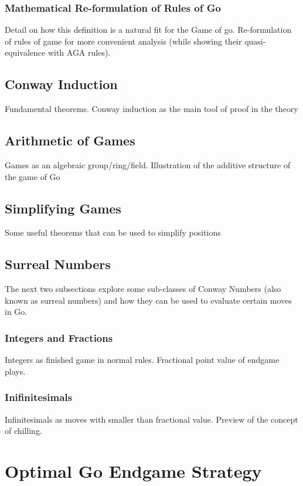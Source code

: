 \documentclass{article}[12pt]
\begin{document}
\subsubsection{Mathematical Re-formulation of Rules of Go}
Detail on how this definition is a natural fit for the Game of go. 
Re-formulation of rules of game for more convenient analysis 
(while showing their quasi-equivalence with AGA rules). 

\subsection{Conway Induction}
Fundamental theorems. Conway induction as the main tool of proof in the 
theory

\subsection{Arithmetic of Games}
Games as an algebraic group/ring/field. Illustration of the additive 
structure of the game of Go

\subsection{Simplifying Games}

Some useful theorems that can be used to simplify positions 

\subsection{Surreal Numbers}
The next two subsections explore some sub-classes of Conway Numbers 
(also known as surreal numbers) and how they can be used to evaluate 
certain moves in Go.

\subsubsection{Integers and Fractions}

Integers as finished game in normal rules. Fractional point value 
of endgame plays.

\subsubsection{Inifinitesimals}

Infinitesimals as moves with smaller than fractional value. 
Preview of the concept of chilling.

\section{Optimal Go Endgame Strategy}
\end{document}
